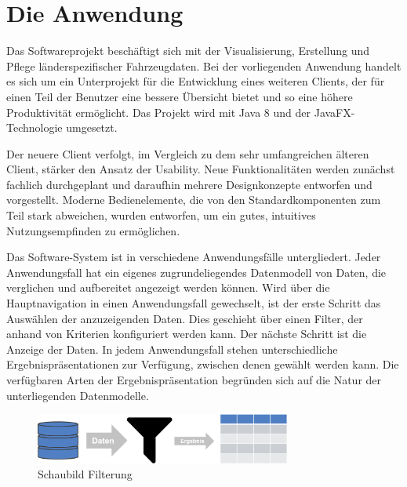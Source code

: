 \section{Die Anwendung} \label{sec:application}
Das Softwareprojekt beschäftigt sich mit der Visualisierung, Erstellung und Pflege länderspezifischer Fahrzeugdaten. Bei der vorliegenden Anwendung handelt es sich um ein Unterprojekt für die Entwicklung eines weiteren Clients, der für einen Teil der Benutzer eine bessere Übersicht bietet und so eine höhere Produktivität ermöglicht. Das Projekt wird mit Java 8 und der JavaFX-Technologie umgesetzt.\par
Der neuere Client verfolgt, im Vergleich zu dem sehr umfangreichen älteren Client, stärker den Ansatz der Usability. Neue Funktionalitäten werden zunächst fachlich durchgeplant und daraufhin mehrere Designkonzepte entworfen und vorgestellt. Moderne Bedienelemente, die von den Standardkomponenten zum Teil stark abweichen, wurden entworfen, um ein gutes, intuitives Nutzungsempfinden zu ermöglichen.\par
Das Software-System ist in verschiedene Anwendungsfälle untergliedert. Jeder Anwendungsfall hat ein eigenes zugrundeliegendes Datenmodell von Daten, die verglichen und aufbereitet angezeigt werden können. Wird über die Hauptnavigation in einen Anwendungsfall gewechselt, ist der erste Schritt das Auswählen der anzuzeigenden Daten. Dies geschieht über einen Filter, der anhand von Kriterien konfiguriert werden kann. Der nächste Schritt ist die Anzeige der Daten. In jedem Anwendungsfall stehen unterschiedliche Ergebnispräsentationen zur Verfügung, zwischen denen gewählt werden kann. Die verfügbaren Arten der Ergebnispräsentation begründen sich auf die Natur der unterliegenden Datenmodelle.\par
\begin{figure}[H]
 \centering
 \includegraphics[width=0.75\textwidth]{grafiken/schaubild_filter.png}
 \caption{Schaubild Filterung}
 \label{fig:conceptFilter}
\end{figure}